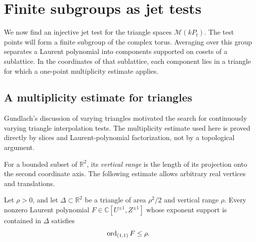 \section{Finite subgroups as jet tests}\label{sec:lattice}

We now find an injective jet test for the triangle spaces $\mathcal{M}(kP_t)$.  The test points will form a finite subgroup of the complex torus.  Averaging over this group separates a Laurent polynomial into components supported on cosets of a sublattice.  In the coordinates of that sublattice, each component lies in a triangle for which a one-point multiplicity estimate applies.

\subsection{A multiplicity estimate for triangles}

Gundlach's discussion of varying triangles \cite[Section~6, Remark~28, Question~29, and Remark~30]{Gundlach2021} motivated the search for continuously varying triangle interpolation tests.  The multiplicity estimate used here is proved directly by slices and Laurent-polynomial factorization, not by a topological argument.

For a bounded subset of $\mathbb{R}^2$, its \emph{vertical range} is the length of its projection onto the second coordinate axis.  The following estimate allows arbitrary real vertices and translations.

\begin{lemma}\label{lem:triangle-multiplicity}
Let $\rho>0$, and let $\Delta\subset\mathbb{R}^2$ be a triangle of area $\rho^2/2$ and vertical range $\rho$.  Every nonzero Laurent polynomial $F\in\mathbb{C}[U^{\pm1},Z^{\pm1}]$ whose exponent support is contained in $\Delta$ satisfies
\[
 \operatorname{ord}_{(1,1)}F\leq\rho.
\]
\end{lemma}



